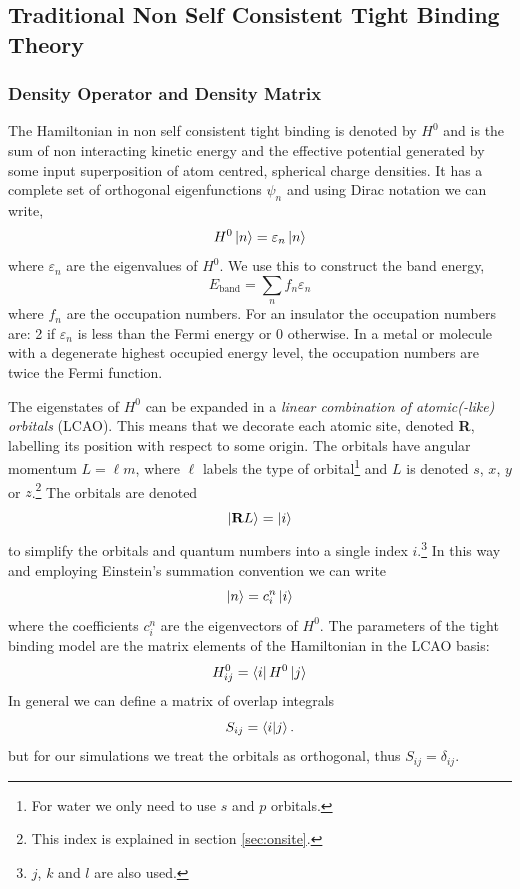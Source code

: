 \documentclass{article}
\begin{document}
\begin{multicols}{2}
\subsection{Traditional Non Self Consistent Tight Binding Theory}
\subsubsection{Density Operator and Density Matrix} 
\label{sec:density}
The Hamiltonian in non self consistent tight binding is denoted by $H^{0}$ and is the sum of non interacting kinetic energy and the effective potential generated by some input superposition of atom centred, spherical charge densities.\cite{Finnis2003} It has a complete set of orthogonal eigenfunctions $\psi_n$ and using Dirac notation we can write,
\begin{equation}
	H^0\ket{n}=\varepsilon_n\ket{n}
\end{equation}
where $\varepsilon_n$ are the eigenvalues of $H^0$. We use this to construct the band energy,
\begin{equation}
	E_{\text{band}}=\sum_{n}f_n\varepsilon_n
\end{equation}
where $f_n$ are the occupation numbers. For an insulator the occupation numbers are: 2 if $\varepsilon_n$ is less than the Fermi energy or 0 otherwise. In a metal or molecule with a degenerate highest occupied energy level, the occupation numbers are twice the Fermi function.

The eigenstates of $H^0$ can be expanded in a \textit{linear combination of atomic(-like) orbitals} (LCAO). \cite{huheey2006inorganic}
This means that we decorate each atomic site, denoted \textbf{R}, labelling its position with respect to some origin. The orbitals have angular momentum $L = \ell m$, where $\ell$ labels the type of orbital\footnote{For water we only need to use $s$ and $p$ orbitals.} and $L$ is denoted $s$, $x$, $y$ or $z$.\footnote{This index is explained in section \ref{sec:onsite}.} The orbitals are denoted
\begin{equation}
	\ket{\textbf{R}L}=\ket{i}
\end{equation}
to simplify the orbitals and quantum numbers into a single index $i$.\footnote{$j$, $k$ and $l$ are also used.} In this way and employing Einstein's summation convention we can write
\begin{equation}
	\ket{n} = c^{n}_{i}\ket{i}
\end{equation}
where the coefficients $c^{n}_{i}$ are the eigenvectors of $H^{0}$. The parameters of the tight binding model are the matrix elements of the Hamiltonian in the LCAO basis:
\begin{equation}
	H^{0}_{ij} =\bra{i}H^{0}\ket{j}
\end{equation}
In general we can define a matrix of overlap integrals
\begin{equation}
	S_{ij}=\bra{i}\ket{j}.
\end{equation}
but for our simulations we treat the orbitals as orthogonal, thus $S_{ij} =\delta_{ij}$.
 

\end{multicols}
\end{document}
